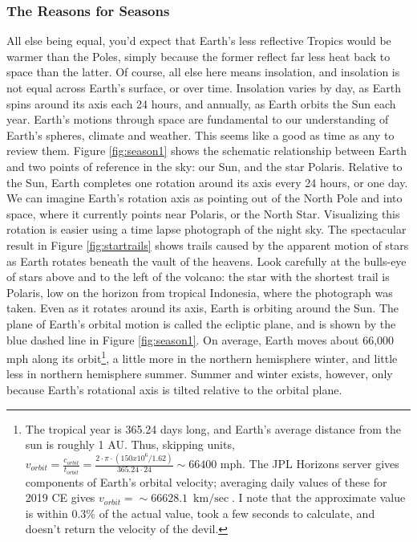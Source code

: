 \documentclass[amstex,12pt]{book}
\begin{document}
\subsubsection{The Reasons for Seasons}
All else being equal, you'd expect that Earth's less reflective Tropics would be warmer than the Poles, simply because the former reflect far less heat back to space than the latter. Of course, all else here means insolation, and insolation is not equal across Earth's surface, or over time. Insolation varies by day, as Earth spins around its axis each 24 hours, and annually, as Earth orbits the Sun each year. Earth's motions through space are fundamental to our understanding of Earth's spheres, climate and weather. This seems like a good as time as any to review them. Figure \ref{fig:season1} shows the schematic relationship between Earth and two points of reference in the sky: our Sun, and the star Polaris. Relative to the Sun, Earth completes one rotation around its axis every 24 hours, or one day. We can imagine Earth's rotation axis as pointing out of the North Pole and into space, where it currently points near Polaris, or the North Star. Visualizing this rotation is easier using a time lapse photograph of the night sky. The spectacular result in Figure \ref{fig:startrails} shows trails caused by the apparent motion of stars as Earth rotates beneath the vault of the heavens. Look carefully at the bulls-eye of stars above and to the left of the volcano: the star with the shortest trail is Polaris, low on the horizon from tropical Indonesia, where the photograph was taken. Even as it rotates around its axis, Earth is orbiting around the Sun. The plane of Earth's orbital motion is called the ecliptic plane, and is shown by the blue dashed line in Figure \ref{fig:season1}. On average, Earth moves about 66,000 mph along its orbit\footnote{The tropical year is 365.24 days long, and Earth's average distance from the sun is roughly 1 AU. Thus, skipping units, $v_{orbit}=\frac{c_{orbit}}{t_{orbit}}=\frac{2\cdot\pi\cdot(150x10^6/1.62)}{365.24\cdot24}\sim 66400$ mph. The JPL Horizons server gives components of Earth's orbital velocity; averaging daily values of these for 2019 CE gives  $v_{orbit}=\sim\SI{66628.1}{\kilo\metre\per\sec}$. I note that the approximate value is within 0.3\% of the actual value, took a few seconds to calculate, and doesn't return the velocity of the devil.}, a little more in the northern hemisphere winter, and little less in northern hemisphere summer. Summer and winter exists, however, only because Earth's rotational axis is tilted relative to the orbital plane.
\end{document}
